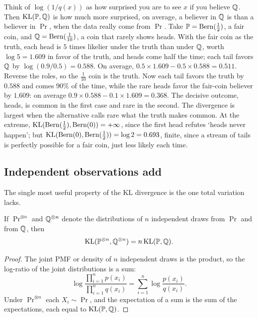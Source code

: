 \begin{intuition}
Think of $\log(1/q(x))$ as how surprised you are to see $x$ if you believe $\mathbb{Q}$.
Then $\mathrm{KL}(\mathbb{P}, \mathbb{Q})$ is how much more surprised, on average, a believer in $\mathbb{Q}$ is than a believer in $\Pr$, when the data really come from $\Pr$.
Take $\mathbb{P} = \text{Bern}(\frac12)$, a fair coin, and $\mathbb{Q} = \text{Bern}(\frac1{10})$, a coin that rarely shows heads.
With the fair coin as the truth, each head is $5$ times likelier under the truth than under $\mathbb{Q}$, worth $\log 5 = 1.609$ in favor of the truth, and heads come half the time; each tail favors $\mathbb{Q}$ by $\log(0.9/0.5) = 0.588$.
On average, $0.5 \times 1.609 - 0.5 \times 0.588 = 0.511$.
Reverse the roles, so the $\frac1{10}$ coin is the truth.
Now each tail favors the truth by $0.588$ and comes $90\%$ of the time, while the rare heads favor the fair-coin believer by $1.609$: on average $0.9 \times 0.588 - 0.1 \times 1.609 = 0.368$.
The decisive outcome, heads, is common in the first case and rare in the second.
The divergence is largest when the alternative calls rare what the truth makes common.
At the extreme, $\mathrm{KL}(\text{Bern}(\frac12), \text{Bern}(0)) = +\infty$, since the first head refutes `heads never happen'; but $\mathrm{KL}(\text{Bern}(0), \text{Bern}(\frac12)) = \log 2 = 0.693$, finite, since a stream of tails is perfectly possible for a fair coin, just less likely each time.
\end{intuition}

\subsection{Independent observations add}

The single most useful property of the KL divergence is the one total variation lacks.

\begin{proposition}
\label{prop:kl-additive}
If $\Pr^{\otimes n}$ and $\mathbb{Q}^{\otimes n}$ denote the distributions of $n$ independent draws from $\Pr$ and from $\mathbb{Q}$, then
\[
\mathrm{KL}(\mathbb{P}^{\otimes n}, \mathbb{Q}^{\otimes n}) = n \, \mathrm{KL}(\mathbb{P}, \mathbb{Q}).
\]
\end{proposition}

\begin{proof}
The joint PMF or density of $n$ independent draws is the product, so the log-ratio of the joint distributions is a sum:
\[
\log \frac{\prod_{i=1}^n p(x_i)}{\prod_{i=1}^n q(x_i)} = \sum_{i=1}^n \log \frac{p(x_i)}{q(x_i)}.
\]
Under $\Pr^{\otimes n}$ each $X_i \sim \Pr$, and the expectation of a sum is the sum of the expectations, each equal to $\mathrm{KL}(\mathbb{P}, \mathbb{Q})$.
\end{proof}

